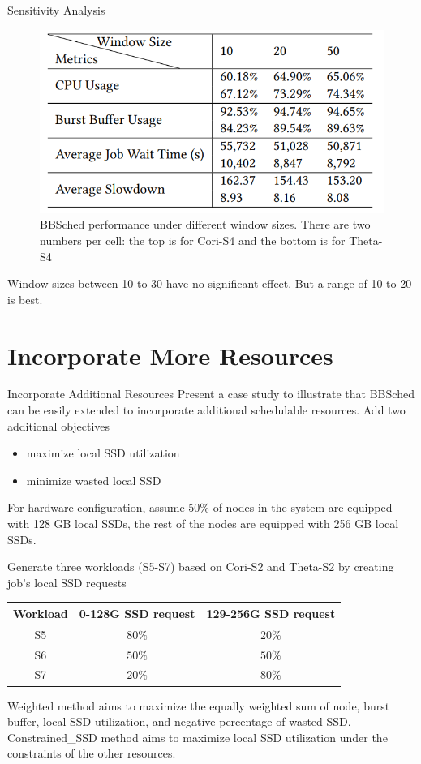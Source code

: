 \documentclass[aspectratio=1610]{beamer}
\begin{document}
\begin{frame}{Sensitivity Analysis}
\begin{figure}
    \centering
    \includegraphics[scale=0.5]{pic/sensititity.png}
    \caption{ BBSched performance under different window sizes. There are two numbers per cell: the top is for Cori-S4 and the bottom is for Theta-S4}
\end{figure}
Window sizes between 10 to 30 have no significant effect. But a range of 10 to 20 is best.
\end{frame}


\section{Incorporate More Resources}

\begin{frame}{Incorporate Additional Resources}
 Present a case study to illustrate that BBSched can be easily extended to incorporate additional schedulable resources. Add two additional objectives
 \begin{itemize}
     \item  maximize local SSD utilization
     \item  minimize wasted local SSD
 \end{itemize}
For hardware configuration, assume 50\% of nodes in the system are equipped with 128 GB local SSDs, the rest of the nodes are equipped with 256 GB local SSDs.

Generate three workloads (S5-S7) based on Cori-S2 and Theta-S2 by
creating job’s local SSD requests

\begin{table}[]
\begin{tabular}{|c|c|c|}
\hline
Workload & 0-128G SSD request & 129-256G SSD request \\ \hline
S5       & $80\%$             & $20\%$               \\ \hline
S6       & $50\%$             & $50\%$               \\ \hline
S7       & $20\%$             & $80\%$               \\ \hline
\end{tabular}
\end{table}
 Weighted method aims to maximize the equally weighted sum of node, burst buffer, local SSD utilization, and negative percentage of wasted SSD. Constrained\_SSD method aims to maximize local SSD utilization under
the constraints of the other resources.
\end{frame}
\end{document}
